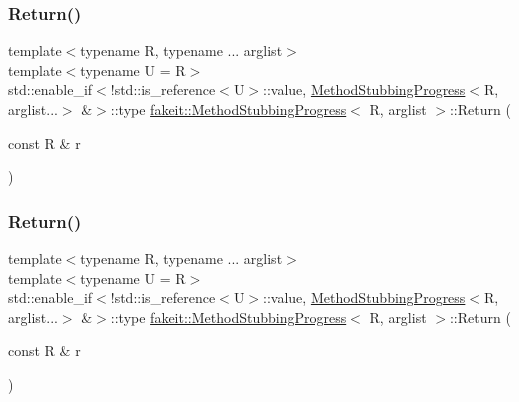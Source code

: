 \mbox{\label{structfakeit_1_1MethodStubbingProgress_ab97be63c322887db40cb788d28875fea}} 
\subsubsection{\texorpdfstring{Return()}{Return()}\hspace{0.1cm}{\footnotesize\ttfamily [20/45]}}
{\footnotesize\ttfamily template$<$typename R, typename ... arglist$>$ \\
template$<$typename U  = R$>$ \\
std\+::enable\+\_\+if$<$!std\+::is\+\_\+reference$<$U$>$\+::value, \mbox{\hyperlink{structfakeit_1_1MethodStubbingProgress}{Method\+Stubbing\+Progress}}$<$R, arglist...$>$ \&$>$\+::type \mbox{\hyperlink{structfakeit_1_1MethodStubbingProgress}{fakeit\+::\+Method\+Stubbing\+Progress}}$<$ R, arglist $>$\+::Return (\begin{DoxyParamCaption}\item[{const R \&}]{r }\end{DoxyParamCaption})\hspace{0.3cm}{\ttfamily [inline]}}

\mbox{\label{structfakeit_1_1MethodStubbingProgress_ab97be63c322887db40cb788d28875fea}} 
\subsubsection{\texorpdfstring{Return()}{Return()}\hspace{0.1cm}{\footnotesize\ttfamily [21/45]}}
{\footnotesize\ttfamily template$<$typename R, typename ... arglist$>$ \\
template$<$typename U  = R$>$ \\
std\+::enable\+\_\+if$<$!std\+::is\+\_\+reference$<$U$>$\+::value, \mbox{\hyperlink{structfakeit_1_1MethodStubbingProgress}{Method\+Stubbing\+Progress}}$<$R, arglist...$>$ \&$>$\+::type \mbox{\hyperlink{structfakeit_1_1MethodStubbingProgress}{fakeit\+::\+Method\+Stubbing\+Progress}}$<$ R, arglist $>$\+::Return (\begin{DoxyParamCaption}\item[{const R \&}]{r }\end{DoxyParamCaption})\hspace{0.3cm}{\ttfamily [inline]}}

